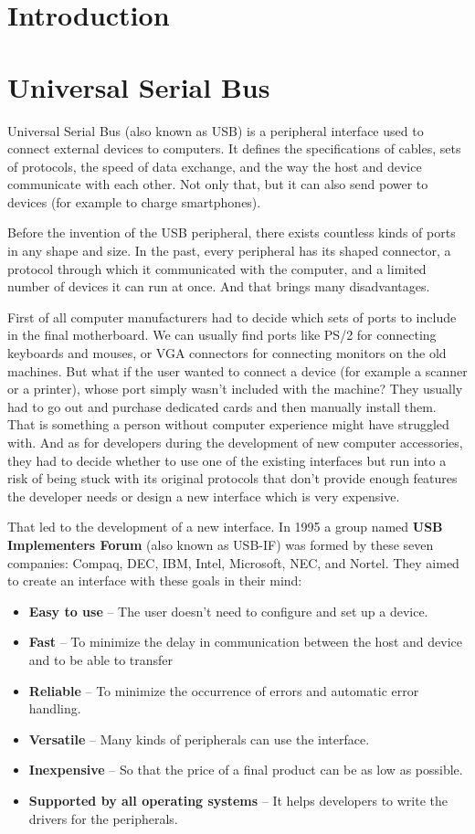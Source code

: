 \chapter{Introduction}
\chapter{Universal Serial Bus}
\label{usb}
Universal Serial Bus (also known as USB) is a peripheral interface used to connect external devices to computers. It defines the specifications of cables, sets of protocols, the speed of data exchange, and the way the host and device communicate with each other. Not only that, but it can also send power to devices (for example to charge smartphones). 

Before the invention of the USB peripheral, there exists countless kinds of ports in any shape and size. In the past, every peripheral has its shaped connector, a protocol through which it communicated with the computer, and a limited number of devices it can run at once. And that brings many disadvantages. 

First of all computer manufacturers had to decide which sets of ports to include in the final motherboard. We can usually find ports like PS/2 for connecting keyboards and mouses, or VGA connectors for connecting monitors on the old machines. But what if the user wanted to connect a device (for example a scanner or a printer), whose port simply wasn't included with the machine? They usually had to go out and purchase dedicated cards and then manually install them. That is something a person without computer experience might have struggled with. And as for developers during the development of new computer accessories, they had to decide whether to use one of the existing interfaces but run into a risk of being stuck with its original protocols that don't provide enough features the developer needs or design a new interface which is very expensive.

That led to the development of a new interface. In 1995 a group named \textbf{USB Implementers Forum} (also known as USB-IF) was formed by these seven companies: Compaq, DEC, IBM, Intel, Microsoft, NEC, and Nortel. They aimed to create an interface with these goals in their mind:
\begin{itemize}
    \item \textbf{Easy to use} \--- The user doesn't need to configure and set up a device. 
    \item \textbf{Fast} \--- To minimize the delay in communication between the host and device and to be able to transfer 
    \item \textbf{Reliable} \--- To minimize the occurrence of errors and automatic error handling.
    \item \textbf{Versatile} \--- Many kinds of peripherals can use the interface.
    \item \textbf{Inexpensive} \--- So that the price of a final product can be as low as possible. 
    \item \textbf{Supported by all operating systems} \--- It helps developers to write the drivers for the peripherals.
\end{itemize}

